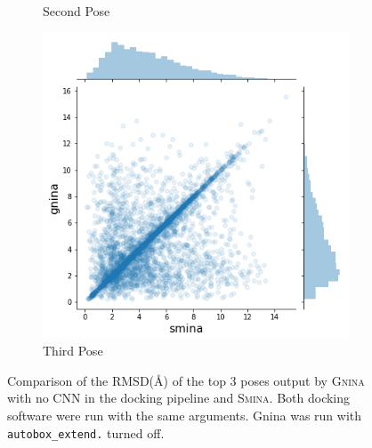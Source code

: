 \documentclass[journal=jcisd8,manuscript=article]{achemso}
\begin{document}
\begin{figure}
\begin{subfigure}[b]{0.32\textwidth}
        \caption{Second Pose}
        \label{fig:SminaCompareTwo}
    \end{subfigure}
    \begin{subfigure}[b]{0.32\textwidth}
        \centering
        \includegraphics[width=\textwidth]{figures/other/thirdpose.png}
        \caption{Third Pose}
        \label{fig:SminaCompareThird}
    \end{subfigure}
    \caption{Comparison of the RMSD(\AA) of the top 3 poses output by \textsc{Gnina} with no CNN in the docking pipeline and \textsc{Smina}. Both docking software were run with the same arguments. Gnina was run with \texttt{autobox\_extend.} turned off.}
    \label{fig:SminaComparePose}
\end{figure}
\end{document}
